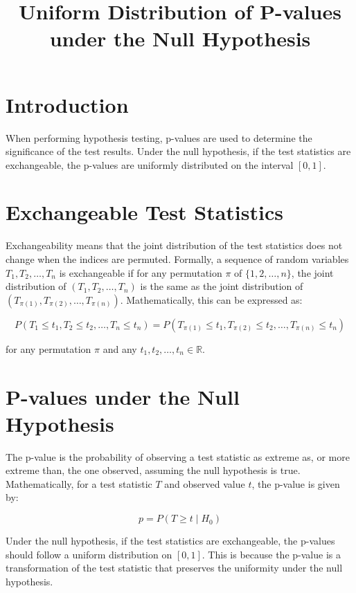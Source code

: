 \documentclass{article}
\title{Uniform Distribution of P-values under the Null Hypothesis}
\author{}
\date{}
\begin{document}
\maketitle

\section{Introduction}

When performing hypothesis testing, p-values are used to determine the significance of the test results. Under the null hypothesis, if the test statistics are exchangeable, the p-values are uniformly distributed on the interval \([0, 1]\).

\section{Exchangeable Test Statistics}

Exchangeability means that the joint distribution of the test statistics does not change when the indices are permuted. Formally, a sequence of random variables \(T_1, T_2, \ldots, T_n\) is exchangeable if for any permutation \(\pi\) of \(\{1, 2, \ldots, n\}\), the joint distribution of \((T_1, T_2, \ldots, T_n)\) is the same as the joint distribution of \((T_{\pi(1)}, T_{\pi(2)}, \ldots, T_{\pi(n)})\). Mathematically, this can be expressed as:

\[
P(T_1 \leq t_1, T_2 \leq t_2, \ldots, T_n \leq t_n) = P(T_{\pi(1)} \leq t_1, T_{\pi(2)} \leq t_2, \ldots, T_{\pi(n)} \leq t_n)
\]

for any permutation \(\pi\) and any \(t_1, t_2, \ldots, t_n \in \mathbb{R}\).

\section{P-values under the Null Hypothesis}

The p-value is the probability of observing a test statistic as extreme as, or more extreme than, the one observed, assuming the null hypothesis is true. Mathematically, for a test statistic \(T\) and observed value \(t\), the p-value is given by:

\[
p = P(T \geq t \mid H_0)
\]

Under the null hypothesis, if the test statistics are exchangeable, the p-values should follow a uniform distribution on \([0, 1]\). This is because the p-value is a transformation of the test statistic that preserves the uniformity under the null hypothesis.
\end{document}
